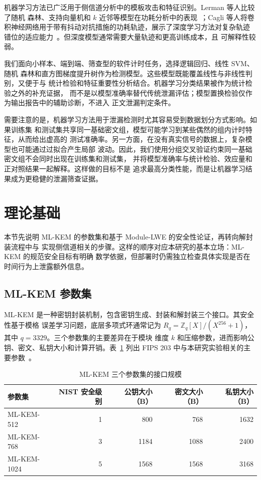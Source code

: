 \documentclass[a4paper,fontset=none]{ctexart}
\begin{document}
机器学习方法已广泛用于侧信道分析中的模板攻击和特征识别。Lerman 等人比较了随机
森林、支持向量机和 $k$ 近邻等模型在功耗分析中的表现~\cite{Lerman2015}；Cagli
等人将卷积神经网络用于带有抖动对抗措施的功耗轨迹，展示了深度学习方法对复杂轨迹
错位的适应能力~\cite{Cagli2017}。但深度模型通常需要大量轨迹和更高训练成本，且
可解释性较弱。

我们面向小样本、端到端、筛查型的软件计时任务，选择逻辑回归、线性 SVM、随机
森林和直方图梯度提升树作为检测模型。这些模型既能覆盖线性与非线性判别，又便于与
统计检验和特征重要性分析结合。机器学习分类结果被作为统计检验之外的补充证据，
而不是以模型准确率替代传统泄漏评估；模型置换检验仅作为输出报告中的辅助诊断，不进入
正文泄漏判定条件。

需要注意的是，机器学习方法用于泄漏检测时尤其容易受到数据划分方式影响。如果训练集
和测试集共享同一基础密文组，模型可能学习到某些偶然的组内计时特征，从而给出虚高的
测试准确率。另一方面，在没有真实信号的数据上，复杂模型也可能通过过拟合产生局部
波动。因此，我们使用分组交叉验证约束同一基础密文组不会同时出现在训练集和测试集，
并将模型准确率与统计检验、效应量和正对照结果一起解释。这样做的目标不是
追求最高分类性能，而是让机器学习结果成为更稳健的泄漏筛查证据。

\section{理论基础}
\label{sec:background}

本节先说明 ML-KEM 的参数集和基于 Module-LWE 的安全性论证，再转向解封装流程中与
实现侧信道相关的步骤。这样的顺序对应本研究的基本立场：ML-KEM 的规范安全目标有明确
数学依据，但部署时仍需独立检查具体实现是否在时间行为上泄露额外信息。

\subsection{ML-KEM 参数集}

ML-KEM 是一种密钥封装机制，包含密钥生成、封装和解封装三个接口。其安全性基于模格
误差学习问题，底层多项式环通常记为
$R_q=\mathbb{Z}_q[X]/(X^{256}+1)$，其中 $q=3329$。三个参数集的主要差异在于模块
维度 $k$ 和压缩参数，进而影响公钥、密文、私钥大小和计算开销。表~\ref{tab:mlkem}
列出 FIPS 203 中与本研究实验相关的主要参数~\cite{FIPS203}。

\begin{table}[H]
  \centering
  \caption{ML-KEM 三个参数集的接口规模}
  \label{tab:mlkem}
  \begin{tabular}{lrrrr}
    \toprule
    参数集 & NIST 安全级别 & 公钥大小（B） & 密文大小（B） & 私钥大小（B） \\
    \midrule
    ML-KEM-512  & 1 & 800   & 768  & 1632 \\
    ML-KEM-768  & 3 & 1184  & 1088 & 2400 \\
    ML-KEM-1024 & 5 & 1568  & 1568 & 3168 \\
    \bottomrule
  \end{tabular}
\end{table}
\end{document}
